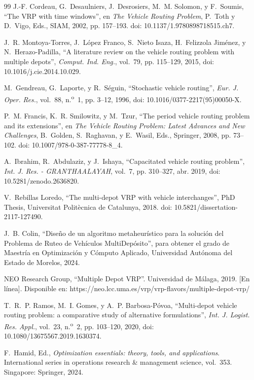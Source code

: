 \begin{thebibliography}{99}
 J.-F. Cordeau, G.~Desaulniers, J.~Desrosiers, M.~M. Solomon, y F.~Soumis, ``The VRP with time windows'', en \emph{The Vehicle Routing Problem}, P.~Toth y D.~Vigo, Eds., SIAM, 2002, pp. 157--193. doi: 10.1137/1.9780898718515.ch7.

 J.~R. Montoya-Torres, J.~L\'opez Franco, S.~Nieto Isaza, H.~Felizzola Jim\'enez, y N.~Herazo-Padilla, ``A literature review on the vehicle routing problem with multiple depots'', \emph{Comput. Ind. Eng.}, vol.~79, pp. 115--129, 2015, doi: 10.1016/j.cie.2014.10.029.

 M.~Gendreau, G.~Laporte, y R.~S\'eguin, ``Stochastic vehicle routing'', \emph{Eur. J. Oper. Res.}, vol.~88, n.\textsuperscript{o}~1, pp. 3--12, 1996, doi: 10.1016/0377-2217(95)00050-X.

 P.~M. Francis, K.~R. Smilowitz, y M.~Tzur, ``The period vehicle routing problem and its extensions'', en \emph{The Vehicle Routing Problem: Latest Advances and New Challenges}, B.~Golden, S.~Raghavan, y E.~Wasil, Eds., Springer, 2008, pp. 73--102. doi: 10.1007/978-0-387-77778-8\_4.

 A.~Ibrahim, R.~Abdulaziz, y J.~Ishaya, ``Capacitated vehicle routing problem'', \emph{Int. J. Res. - GRANTHAALAYAH}, vol.~7, pp. 310--327, abr. 2019, doi: 10.5281/zenodo.2636820.

 V.~Rebillas Loredo, ``The multi-depot VRP with vehicle interchanges'', PhD Thesis, Universitat Polit\`ecnica de Catalunya, 2018. doi: 10.5821/dissertation-2117-127490.

 J.~B. Colin, ``Dise\~no de un algoritmo metaheur\'istico para la soluci\'on del Problema de Ruteo de Veh\'iculos MultiDep\'osito'', para obtener el grado de Maestr\'ia en Optimizaci\'on y C\'omputo Aplicado, Universidad Aut\'onoma del Estado de Morelos, 2024.

 NEO Research Group, ``Multiple Depot VRP''. Universidad de M\'alaga, 2019. [En l\'inea]. Disponible en: https://neo.lcc.uma.es/vrp/vrp-flavors/multiple-depot-vrp/

 T.~R.~P. Ramos, M.~I. Gomes, y A.~P. Barbosa-P\'ovoa, ``Multi-depot vehicle routing problem: a comparative study of alternative formulations'', \emph{Int. J. Logist. Res. Appl.}, vol.~23, n.\textsuperscript{o}~2, pp. 103--120, 2020, doi: 10.1080/13675567.2019.1630374.

 F.~Hamid, Ed., \emph{Optimization essentials: theory, tools, and applications}. International series in operations research \& management science, vol.~353. Singapore: Springer, 2024.


\end{thebibliography}
